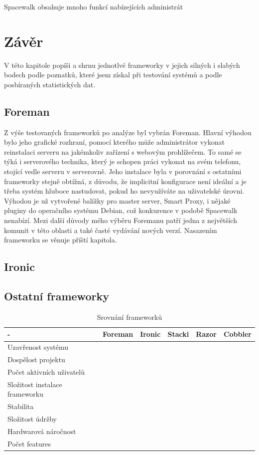 \documentclass[thesis=B,czech]{FITthesis}[2012/06/26]
\begin{document}
Spacewalk obsahuje mnoho funkcí nabízejících administrát

\section{Závěr}


V této kapitole popíši a shrnu jednotlvé frameworky v jejich silných i slabých bodech podle poznatků, které jsem získal při testování systémů a podle posbíraných statistických dat. 


\subsection{Foreman}



Z výše testovaných frameworků po analýze byl vybrán Foreman. Hlavní výhodou bylo jeho grafické rozhraní, pomocí kterého může administrátor vykonat reinstalaci serveru na jakémkoliv zařízení s webovým prohlížečem. To samé se týká i serverového technika, který je schopen práci vykonat na svém telefonu, stojící vedle serveru v serverovně. Jeho instalace byla v porovnání s ostatními frameworky stejně obtížná, z důvodu, že implicitní konfigurace není ideální a je třeba systém hluboce nastudovat, pokud ho nevyužíváte na uživatelské úrovni. Výhodou je už vytvořené balížky pro master server, Smart Proxy, i nějaké pluginy do operačního systému Debian, což konkurence v podobě Spacewalk nenabízí. Mezi další důvody mého výběru Foremanu patří jedna z největších komunit v této oblasti a také časté vydávání nových verzí. Nasazením frameworku se věnuje příští kapitola.


\subsection{Ironic}


\subsection{Ostatní frameworky}

\begin{table}[h]
\centering
\caption{Srovnání frameworků}
\label{my-label}
\begin{tabular}{@{}llllll@{}}
\toprule

- &	Foreman &	Ironic & Stacki & Razor & Cobbler  \\ \midrule
Uzavřenost systému & & & & & \\ 
Dospělost projektu & & & & & \\ 
Počet aktivních uživatelů & & & & & \\ 
Složitost instalace frameworku & & & & & \\ 
Stabilita & & & & & \\ 
Složitost údržby & & & & & \\ 
Hardwarová náročnost & & & & & \\ 
Počet features & & & & & \\ \bottomrule
\end{tabular}
\end{table}
\end{document}

